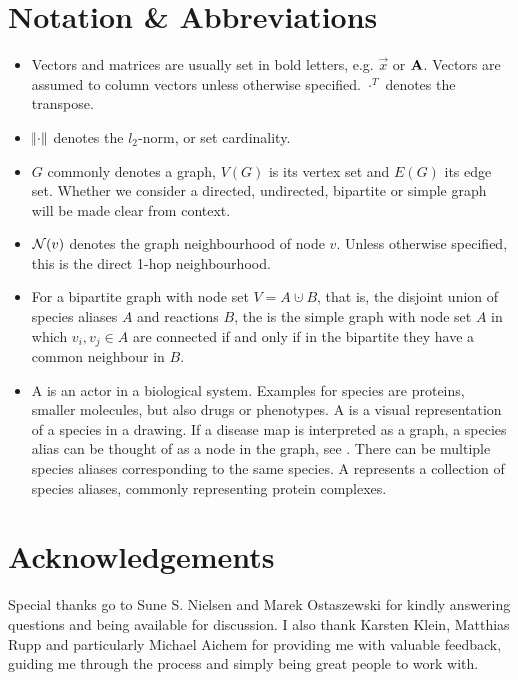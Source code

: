 \documentclass[
	fontsize=10pt, %
	twoside=false, %
	secnumdepth=1, %
  toc=indentunnumbered %
]{kaobook}
\begin{document}
\section{Notation \& Abbreviations}
\begin{itemize}
\item Vectors and matrices are usually set in bold letters, e.g. $\vec x$ or
  $\mathbf{A}$. Vectors are assumed to column vectors unless otherwise specified.
  $\cdot^T$ denotes the transpose.
\item $\norm{\cdot}$ denotes the $l_2$-norm, or set cardinality.
\item $G$ commonly denotes a graph, $V(G)$ is its vertex set and $E(G)$ its edge
  set. Whether we consider a directed, undirected, bipartite or simple graph
  will be made clear from context.
\item $\mathcal{N}(v)$ denotes the graph neighbourhood of node $v$. Unless otherwise
  specified, this is the direct 1-hop neighbourhood.
\item For a bipartite graph with node set $V = A
  \cupdot B$, that is, the disjoint union of species aliases $A$ and reactions
  $B$, the  is the simple graph with node set
  $A$ in which $v_i, v_j \in A$ are connected if and only if in the bipartite
  they have a common neighbour in $B$.
\item A  is an actor in a biological system. Examples for species
  are proteins, smaller molecules, but also drugs or phenotypes. A  is a visual representation of a species in a drawing. If a disease map
  is interpreted as a graph, a species alias can be thought of as a node in the
  graph, see . There can be multiple species
  aliases corresponding to the same species. A 
  represents a collection of species aliases, commonly representing protein
  complexes.
\end{itemize}




\section{Acknowledgements}

Special thanks go to Sune S. Nielsen and Marek Ostaszewski for kindly answering
questions and being available for discussion. I also thank Karsten Klein,
Matthias Rupp and particularly Michael Aichem for providing me with valuable
feedback, guiding me through the process and simply being great people to work
with.
\end{document}
